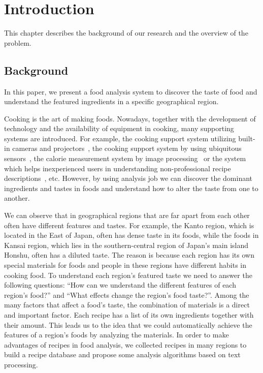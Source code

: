 \chapter{Introduction}\label{chap:intro}
This chapter describes the background of our research and the overview of the problem.
\clearpage
\section{Background}\label{sec:intro_background}
In this paper, we present a food analysis system to discover the taste of food and understand the featured ingredients in a specific geographical region.
\par Cooking is the art of making foods. Nowadays, together with the development of technology and the availability of equipment in cooking, many supporting systems are introduced. For example, the cooking support system utilizing built-in cameras and projectors~\cite{morioka:camera-projecter}, the cooking support system by using ubiquitous sensors~\cite{nakauchi:recog}, the calorie measurement system by image processing~\cite{villalobos:image-calorie} or the system which helps inexperienced users in understanding non-professional recipe descriptions~\cite{ide:inexper}, etc. However, by using analysis job we can discover the dominant ingredients and tastes in foods and understand how to alter the taste from one to another.
\par We can observe that in geographical regions that are far apart from each other often have different features and tastes. For example, the Kanto region, which is located in the East of Japan, often has dense taste in its foods, while the foods in Kansai region, which lies in the southern-central region of Japan's main island Honshu, often has a diluted taste. The reason is because each region has its own special materials for foods and people in these regions have different habits in cooking food. To understand each region's featured taste we need to answer the following questions: ``How can we understand the different features of each region's food?'' and ``What effects change the region's food taste?''. Among the many factors that affect a food's taste, the combination of materials is a direct and important factor. Each recipe has a list of its own ingredients together with their amount. This leads us to the idea that we could automatically achieve the features of a region's foods by analyzing the materials. In order to make advantages of recipes in food analysis, we collected recipes in many regions to build a recipe database and propose some analysis algorithms based on text processing.



